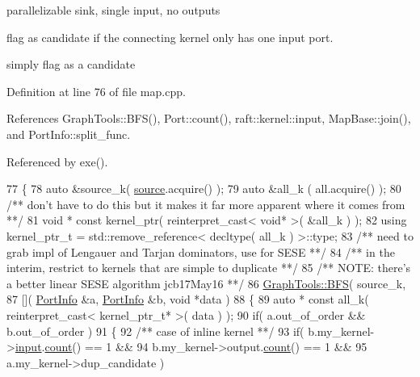 parallelizable sink, single input, no outputs

flag as candidate if the connecting kernel only has one input port.

simply flag as a candidate 

Definition at line 76 of file map.\+cpp.



References Graph\+Tools\+::\+B\+F\+S(), Port\+::count(), raft\+::kernel\+::input, Map\+Base\+::join(), and Port\+Info\+::split\+\_\+func.



Referenced by exe().


\begin{DoxyCode}
77 \{
78     \textcolor{keyword}{auto} &source\_k( \hyperlink{classsource}{source}.acquire() );
79     \textcolor{keyword}{auto} &all\_k   ( all.acquire()    );\textcolor{comment}{}
80 \textcolor{comment}{    /** don't have to do this but it makes it far more apparent where it comes from **/}
81     \textcolor{keywordtype}{void} * \textcolor{keyword}{const} kernel\_ptr( reinterpret\_cast< void* >( &all\_k ) );
82     \textcolor{keyword}{using} kernel\_ptr\_t = std::remove\_reference< decltype( all\_k ) >::type;\textcolor{comment}{}
83 \textcolor{comment}{    /** need to grab impl of Lengauer and Tarjan dominators, use for SESE **/}\textcolor{comment}{}
84 \textcolor{comment}{    /** in the interim, restrict to kernels that are simple to duplicate **/}\textcolor{comment}{}
85 \textcolor{comment}{    /** NOTE: there's a better linear SESE algorithm jcb17May16 **/}
86     \hyperlink{class_graph_tools_ade51007699cbd681c1a37946609c46ee}{GraphTools::BFS}( source\_k,
87                      []( \hyperlink{struct_port_info}{PortInfo} &a, \hyperlink{struct_port_info}{PortInfo} &b, \textcolor{keywordtype}{void} *data )
88                      \{
89                         \textcolor{keyword}{auto} * \textcolor{keyword}{const} all\_k( reinterpret\_cast< kernel\_ptr\_t* >( data ) );
90                         \textcolor{keywordflow}{if}( a.out\_of\_order && b.out\_of\_order )
91                         \{\textcolor{comment}{}
92 \textcolor{comment}{                           /** case of inline kernel **/}
93                            \textcolor{keywordflow}{if}( b.my\_kernel->\hyperlink{classraft_1_1kernel_a6edbe35a56409d402e719b3ac36d6554}{input}.\hyperlink{class_port_a33562ea87ac7e83a32441da40cbd9279}{count}() == 1 &&
94                                b.my\_kernel->output.\hyperlink{class_port_a33562ea87ac7e83a32441da40cbd9279}{count}() == 1 &&
95                                a.my\_kernel->dup\_candidate  )

\end{DoxyCode}
